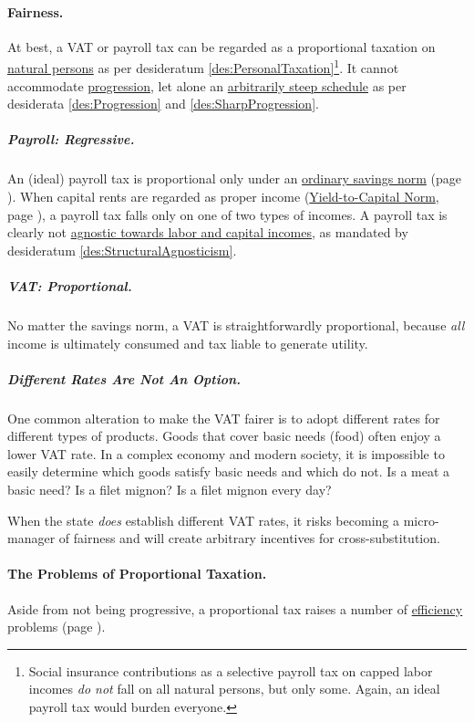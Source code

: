 \paragraph{Fairness.} At best, a VAT or payroll tax can be regarded as a proportional taxation on \hyperref[des:PersonalTaxation]{natural persons} as per desideratum \ref{des:PersonalTaxation}\footnote{
	Social insurance contributions as a selective payroll tax on capped labor incomes \emph{do not} fall on all natural persons, but only some. Again, an ideal payroll tax would burden everyone.}. 
It cannot accommodate \hyperref[des:Progression]{progression}, let alone an \hyperref[des:SharpProgression]{arbitrarily steep schedule} as per  desiderata \ref{des:Progression} and \ref{des:SharpProgression}. 

\subparagraph{Payroll: Regressive.} An (ideal) payroll tax is proportional only under an \hyperref[sec:OSN]{ordinary savings norm} (page \pageref{sec:OSN}). When capital rents are regarded as proper income (\hyperref[sec:Y2C]{Yield-to-Capital Norm}, page \pageref{sec:Y2C}), a payroll tax falls only on one of two types of incomes. A payroll tax is clearly not \hyperref[des:StructuralAgnosticism]{agnostic towards labor and capital incomes}, as mandated by desideratum \ref{des:StructuralAgnosticism}. 

\subparagraph{VAT: Proportional.} No matter the savings norm, a VAT is straightforwardly proportional, because \emph{all} income is ultimately consumed and tax liable to generate utility. 

\subparagraph{Different Rates Are Not An Option.} One common alteration to make the VAT fairer is to adopt different rates for different types of products. Goods that cover basic needs (food) often enjoy a lower VAT rate. In a complex economy and modern society, it is impossible to easily determine which goods satisfy basic needs and which do not. Is a meat a basic need? Is a filet mignon? Is a filet mignon every day?

When the state \emph{does} establish different VAT rates, it risks becoming a micro-manager of fairness and will create arbitrary incentives for cross-substitution.

\paragraph{The Problems of Proportional Taxation.} Aside from not being progressive, a proportional tax raises a number of \hyperref[sec:Efficiency]{efficiency} problems (page \pageref{sec:Efficiency}). 

